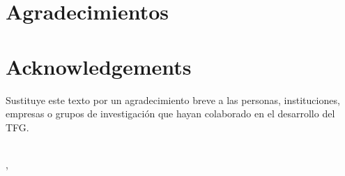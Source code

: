 \pagestyle{plain}
\ifspanish
    \chapter*{Agradecimientos}
\else
    \chapter*{Acknowledgements}
\fi

Sustituye este texto por un agradecimiento breve a las personas, instituciones,
empresas o grupos de investigación que hayan colaborado en el desarrollo del
TFG.

\makeatletter
\begin{flushright}
    \vspace{1.5cm}
    \textit{\@autor}\\
    \@cityTF, \@yearTF
\end{flushright}
\makeatother

\cleardoublepage

